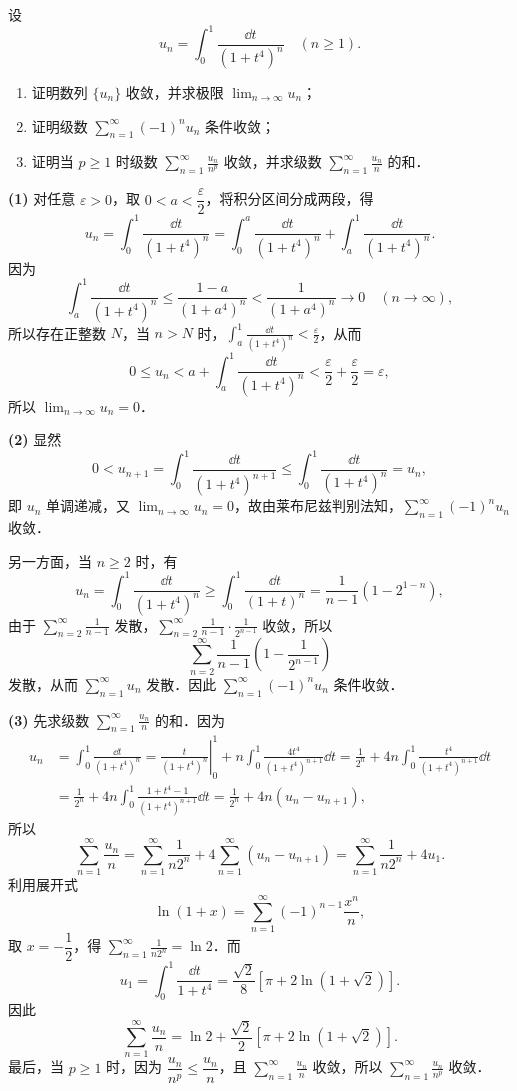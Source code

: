 设
\[
  u_n=\int_0^1\frac{\dd t}{(1+t^4)^n}\quad(n\ge 1).
\]
\begin{enumerate}
  \item 证明数列 $\{u_n\}$ 收敛，并求极限 $\displaystyle \lim_{n\to\infty}u_n$；
  \item 证明级数 $\displaystyle \sum_{n=1}^{\infty}(-1)^nu_n$ 条件收敛；
  \item 证明当 $p\ge 1$ 时级数 $\displaystyle \sum_{n=1}^{\infty}\frac{u_n}{n^p}$ 收敛，并求级数 $\displaystyle \sum_{n=1}^{\infty}\frac{u_n}{n}$ 的和．
\end{enumerate}
\begin{solution}
\textbf{(1)} 对任意 $\varepsilon>0$，取 $0<a<\dfrac{\varepsilon}{2}$，将积分区间分成两段，得
\[
  u_n=\int_0^1\frac{\dd t}{(1+t^4)^n}
  =\int_0^a\frac{\dd t}{(1+t^4)^n}+\int_a^1\frac{\dd t}{(1+t^4)^n}.
\]
因为
\[
  \int_a^1\frac{\dd t}{(1+t^4)^n}
  \le\frac{1-a}{(1+a^4)^n}<\frac{1}{(1+a^4)^n}\to0\quad(n\to\infty),
\]
所以存在正整数 $N$，当 $n>N$ 时，$\displaystyle\int_a^1\frac{\dd t}{(1+t^4)^n}<\frac{\varepsilon}{2}$，从而
\[
  0\le u_n<a+\int_a^1\frac{\dd t}{(1+t^4)^n}<\frac{\varepsilon}{2}+\frac{\varepsilon}{2}=\varepsilon,
\]
所以 $\displaystyle\lim_{n\to\infty}u_n=0$．

\textbf{(2)} 显然
\[
  0<u_{n+1}=\int_0^1\frac{\dd t}{(1+t^4)^{n+1}}
  \le\int_0^1\frac{\dd t}{(1+t^4)^n}=u_n,
\]
即 $u_n$ 单调递减，又 $\displaystyle\lim_{n\to\infty}u_n=0$，故由莱布尼兹判别法知，$\displaystyle\sum_{n=1}^{\infty}(-1)^nu_n$ 收敛．

另一方面，当 $n\ge2$ 时，有
\[
  u_n=\int_0^1\frac{\dd t}{(1+t^4)^n}
  \ge\int_0^1\frac{\dd t}{(1+t)^n}
  =\frac{1}{n-1}\left(1-2^{1-n}\right),
\]
由于 $\displaystyle\sum_{n=2}^{\infty}\frac{1}{n-1}$ 发散，$\displaystyle\sum_{n=2}^{\infty}\frac{1}{n-1}\cdot\frac{1}{2^{n-1}}$ 收敛，所以
\[
  \sum_{n=2}^{\infty}\frac{1}{n-1}\left(1-\frac{1}{2^{n-1}}\right)
\]
发散，从而 $\displaystyle\sum_{n=1}^{\infty}u_n$ 发散．因此 $\displaystyle\sum_{n=1}^{\infty}(-1)^nu_n$ 条件收敛．

\textbf{(3)} 先求级数 $\displaystyle\sum_{n=1}^{\infty}\frac{u_n}{n}$ 的和．因为
\begin{align*}
u_n&=\int_0^1\frac{\dd t}{(1+t^4)^n}
=\left.\frac{t}{(1+t^4)^n}\right|_0^1+n\int_0^1\frac{4t^4}{(1+t^4)^{n+1}}\dd t
=\frac{1}{2^n}+4n\int_0^1\frac{t^4}{(1+t^4)^{n+1}}\dd t\\
&=\frac{1}{2^n}+4n\int_0^1\frac{1+t^4-1}{(1+t^4)^{n+1}}\dd t
=\frac{1}{2^n}+4n(u_n-u_{n+1}),
\end{align*}
所以
\[
  \sum_{n=1}^{\infty}\frac{u_n}{n}
  =\sum_{n=1}^{\infty}\frac{1}{n2^n}+4\sum_{n=1}^{\infty}(u_n-u_{n+1})
  =\sum_{n=1}^{\infty}\frac{1}{n2^n}+4u_1.
\]
利用展开式
\[
  \ln(1+x)=\sum_{n=1}^{\infty}(-1)^{n-1}\frac{x^n}{n},
\]
取 $x=-\dfrac{1}{2}$，得 $\displaystyle\sum_{n=1}^{\infty}\frac{1}{n2^n}=\ln 2$．而
\[
  u_1=\int_0^1\frac{\dd t}{1+t^4}
  =\frac{\sqrt{2}}{8}\left[\pi+2\ln(1+\sqrt{2})\right].
\]
因此
\[
  \sum_{n=1}^{\infty}\frac{u_n}{n}
  =\ln 2+\frac{\sqrt{2}}{2}\left[\pi+2\ln(1+\sqrt{2})\right].
\]
最后，当 $p\ge1$ 时，因为 $\dfrac{u_n}{n^p}\le\dfrac{u_n}{n}$，且 $\displaystyle\sum_{n=1}^{\infty}\frac{u_n}{n}$ 收敛，所以 $\displaystyle\sum_{n=1}^{\infty}\frac{u_n}{n^p}$ 收敛．
\end{solution}
